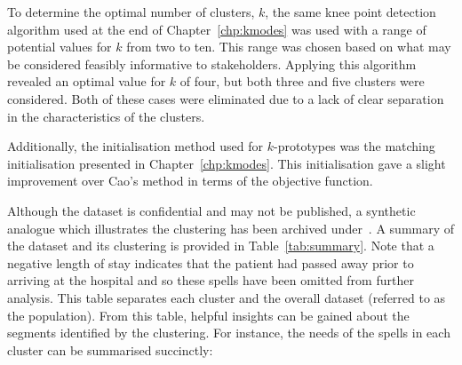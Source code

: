 To determine the optimal number of clusters, \(k\), the same knee point
detection algorithm used at the end of Chapter~\ref{chp:kmodes} was used with a
range of potential values for \(k\) from two to ten. This range was chosen based
on what may be considered feasibly informative to stakeholders. Applying this
algorithm revealed an optimal value for \(k\) of four, but both three and five
clusters were considered. Both of these cases were eliminated due to a lack of
clear separation in the characteristics of the clusters.

Additionally, the initialisation method used for \(k\)-prototypes was the
matching initialisation presented in Chapter~\ref{chp:kmodes}. This
initialisation gave a slight improvement over Cao's method in terms of the
objective function.

\begin{table}
    \centering
    \resizebox{\textwidth}{!}{%
        
    }\caption{%
        A summary of clinical and condition-specific characteristics for each
        cluster and the population
    }\label{tab:summary}
\end{table}

Although the dataset is confidential and may not be published, a synthetic
analogue which illustrates the clustering has been archived
under~. A summary of the dataset and its clustering
is provided in Table~\ref{tab:summary}. Note that a negative length of stay
indicates that the patient had passed away prior to arriving at the hospital and
so these spells have been omitted from further analysis. This table separates
each cluster and the overall dataset (referred to as the population). From this
table, helpful insights can be gained about the segments identified by the
clustering. For instance, the needs of the spells in each cluster can be
summarised succinctly:

